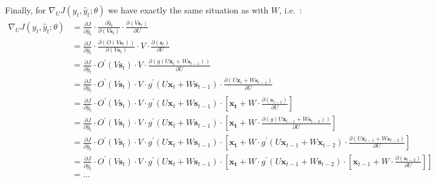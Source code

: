 Finally, for $\nabla_U J(y_t, \hat{y}_t ; \theta)$ we have exactly the same situation as with $W$, i.e.\ :
\begingroup
\allowdisplaybreaks
{\setlength{\jot}{5pt}
\begin{align*}
\nabla_U J(y_t, \hat{y}_t ; \theta)& = \frac{\partial J}{\partial \hat{y}_t}
\cdot \frac{\partial \hat{y}_t}{\partial (V \boldsymbol{s}_{t})} \cdot \frac{\partial (V \boldsymbol{s}_{t})}{\partial U} \\
&= \frac{\partial J}{\partial \hat{y}_t} \cdot \frac{ \partial ( O(V\boldsymbol{s}_{t}))}{\partial (V\boldsymbol{s}_{t})}
\cdot V \cdot \frac{\partial (\boldsymbol{s}_{t})}{\partial U} \\
&= \frac{\partial J}{\partial \hat{y}_t} \cdot O^\prime(V \boldsymbol{s}_{t}) \cdot V
\cdot \frac{\partial (g(U \boldsymbol{x}_{t} + W \boldsymbol{s}_{t-1}))} {\partial U} \\
&= \frac{\partial J}{\partial \hat{y}_t} \cdot O^\prime(V \boldsymbol{s}_{t}) \cdot V
\cdot g^\prime(U \boldsymbol{x}_{t} + W \boldsymbol{s}_{t-1})
\cdot \frac{\partial (U \boldsymbol{x}_{t} + W \boldsymbol{s}_{t-1})} {\partial U} \\
& = \frac{\partial J}{\partial \hat{y}_t} \cdot O^\prime(V \boldsymbol{s}_{t}) \cdot V \cdot g^\prime(U \boldsymbol{x}_{t}
+ W \boldsymbol{s}_{t-1}) \cdot \left[\boldsymbol{x_{t}}
+ W \cdot \frac{\partial(\boldsymbol{s}_{t-1})} {\partial U} \right] \\
& = \frac{\partial J}{\partial \hat{y}_t} \cdot O^\prime(V \boldsymbol{s}_{t}) \cdot V \cdot g^\prime(U \boldsymbol{x}_{t}
+ W \boldsymbol{s}_{t-1}) \cdot \left[\boldsymbol{x_{t}} + W \cdot \frac{\partial (g(U\boldsymbol{x}_{t-1}
+ W \boldsymbol{s}_{t-2}))} {\partial U}\right] \\
& = \frac{\partial J}{\partial \hat{y}_t} \cdot O^\prime(V\boldsymbol{s}_{t}) \cdot V \cdot g^\prime(U\boldsymbol{x}_{t}
+ W \boldsymbol{s}_{t-1}) \cdot \left[\boldsymbol{x_{t}} + W \cdot g^\prime (U\boldsymbol{x}_{t-1}
+ W \boldsymbol{x}_{t-2}) \cdot \frac{\partial(U \boldsymbol{x}_{t-1} + W\boldsymbol{s}_{t-2})} {\partial U} \right] \\
&= \frac{\partial J}{\partial \hat{y}_t} \cdot O^\prime(V\boldsymbol{s}_{t}) \cdot V \cdot g^\prime(U\boldsymbol{x}_{t}
+ W \boldsymbol{s}_{t-1}) \cdot \left[\boldsymbol{x_{t}} + W \cdot g^\prime (U\boldsymbol{x}_{t-1}
+ W \boldsymbol{s}_{t-2}) \cdot \left[\boldsymbol{x}_{t-1}
+ W \cdot \frac{\partial(\boldsymbol{s}_{t-2})} {\partial U} \right] \right] \\
& = \ldots
\end{align*}}
\endgroup

